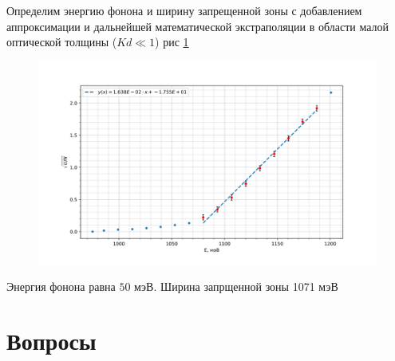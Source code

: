\documentclass[a4paper]{article}
\begin{document}
Определим энергию фонона и ширину запрещенной зоны с добавлением аппроксимации и дальнейшей математической экстраполяции в области малой оптической толщины ($Kd \ll 1 $) рис \ref{gr1}

\begin{figure}[H]
    \centering
    \includegraphics[scale = 0.6]{gr1.png}
    \caption{}
    \label{gr1}
\end{figure} 
Энергия фонона равна $50$ мэВ. Ширина запрщенной зоны 1071 мэВ

\section{Вопросы}
\end{document}

